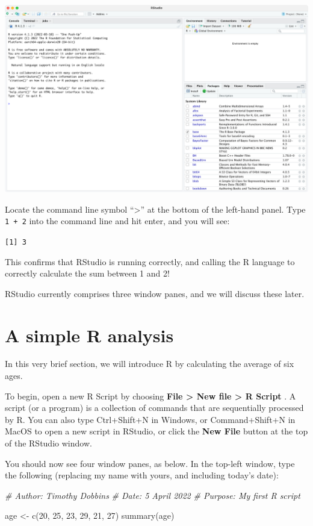 \documentclass[
]{memoir}
\newenvironment{Shaded}{\begin{snugshade}}{\end{snugshade}}
\newcommand{\CommentTok}[1]{\textcolor[rgb]{0.56,0.35,0.01}{\textit{#1}}}
\newcommand{\DecValTok}[1]{\textcolor[rgb]{0.00,0.00,0.81}{#1}}
\newcommand{\FunctionTok}[1]{\textcolor[rgb]{0.00,0.00,0.00}{#1}}
\newcommand{\NormalTok}[1]{#1}
\newcommand{\OtherTok}[1]{\textcolor[rgb]{0.56,0.35,0.01}{#1}}
\begin{document}
\includegraphics[width=1\linewidth]{img/RStudio-screenshot-01}

Locate the command line symbol ``\textgreater{}'' at the bottom of the left-hand panel. Type \texttt{1\ +\ 2} into the command line and hit enter, and you will see:

\texttt{{[}1{]}\ 3}

This confirms that RStudio is running correctly, and calling the R language to correctly calculate the sum between 1 and 2!

RStudio currently comprises three window panes, and we will discuss these later.

\hypertarget{simpleR}{%
\section{A simple R analysis}\label{simpleR}}

In this very brief section, we will introduce R by calculating the average of six ages.

To begin, open a new R Script by choosing \textbf{File \textgreater{} New file \textgreater{} R Script }. A script (or a program) is a collection of commands that are sequentially processed by R. You can also type Ctrl+Shift+N in Windows, or Command+Shift+N in MacOS to open a new script in RStudio, or click the \textbf{New File} button at the top of the RStudio window.

You should now see four window panes, as below. In the top-left window, type the following (replacing my name with yours, and including today's date):

\begin{Shaded}
\begin{Highlighting}[]
\CommentTok{\# Author: Timothy Dobbins}
\CommentTok{\# Date: 5 April 2022}
\CommentTok{\# Purpose: My first R script}

\NormalTok{age }\OtherTok{\textless{}{-}} \FunctionTok{c}\NormalTok{(}\DecValTok{20}\NormalTok{, }\DecValTok{25}\NormalTok{, }\DecValTok{23}\NormalTok{, }\DecValTok{29}\NormalTok{, }\DecValTok{21}\NormalTok{, }\DecValTok{27}\NormalTok{)}
\FunctionTok{summary}\NormalTok{(age)}
\end{Highlighting}
\end{Shaded}
\end{document}
